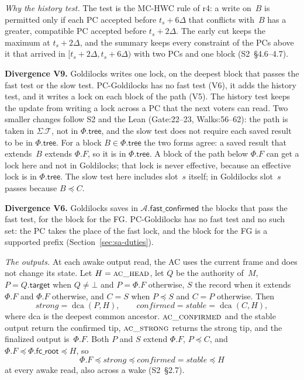 \documentclass{article}
\newcommand{\T}{\mathcal T}
\newcommand{\AC}{\mathcal A}
\newcommand{\Fr}{\Phi}
\newcommand{\tree}{\mathsf{tree}}
\newcommand{\fcroot}{\mathsf{fc\_root}}
\newcommand{\fastConfirmed}{\mathsf{fast\_confirmed}}
\newcommand{\PCdiv}[2]{\par\noindent\textbf{Divergence #1.} #2\par}
\begin{document}
\emph{Why the history test.}  The test is the MC-HWC rule of r4: a write
on~$B$ is permitted only if each PC accepted before $t_s+6\Delta$ that
conflicts with~$B$ has a greater, compatible PC accepted before
$t_s+2\Delta$.  The early cut keeps the maximum at $t_s+2\Delta$, and the
summary keeps every constraint of the PCs above it that arrived in
$[t_s+2\Delta,t_s+6\Delta)$ with two PCs and one block (S2~\S4.6--4.7).

\PCdiv{V9}{Goldilocks writes one lock, on the deepest block that passes
the fast test or the slow test.  PC-Goldilocks has no fast test (V6), it
adds the history test, and it writes a lock on each block of the path
(V5).  The history test keeps the update from writing a lock across a PC
that the next voters can read.  Two smaller changes follow S2 and the
Lean (Gate:22--23, Walks:56--62): the path is taken in $\Sigma.\T$, not in
$\Fr.\tree$, and the slow test does not require each saved result to be in
$\Fr.\tree$.  For a block $B\in\Fr.\tree$ the two forms agree: a saved
result that extends~$B$ extends $\Fr.F$, so it is in $\Fr.\tree$.  A block
of the path below $\Fr.F$ can get a lock here and not in Goldilocks; that
lock is never effective, because an effective lock is in $\Fr.\tree$.
The slow test here includes slot~$s$ itself; in Goldilocks slot~$s$
passes because $B\preceq C$.}

\PCdiv{V6}{Goldilocks saves in $\AC.\fastConfirmed$ the blocks that pass
the fast test, for the block for the FG.  PC-Goldilocks has no fast test
and no such set: the PC takes the place of the fast lock, and the block
for the FG is a supported prefix (Section~\ref{sec:sa-duties}).}

\emph{The outputs.}  At each awake output read, the AC uses the current
frame and does not change its state.  Let $H=\Call{ac\_head}{}$, let $Q$ be
the authority of~$M$, $P=Q.\mathsf{target}$ when $Q\neq\bot$ and
$P=\Fr.F$ otherwise, $S$ the record when it extends~$\Fr.F$ and $\Fr.F$
otherwise, and $C=S$ when $P\preceq S$ and $C=P$ otherwise.  Then
\[
 \mathit{strong}=\operatorname{dca}(P,H),\qquad
 \mathit{confirmed}=\mathit{stable}=\operatorname{dca}(C,H),
\]
where dca is the deepest common ancestor.  $\Call{ac\_confirmed}{}$ and the
stable output return the confirmed tip, $\Call{ac\_strong}{}$ returns the
strong tip, and the finalized output is~$\Fr.F$.  Both $P$ and $S$ extend
$\Fr.F$, $P\preceq C$, and $\Fr.F\preceq\Fr.\fcroot\preceq H$, so
\[
 \Fr.F\preceq\mathit{strong}\preceq\mathit{confirmed}=\mathit{stable}\preceq H
\]
at every awake read, also across a wake (S2~\S2.7).
\end{document}
